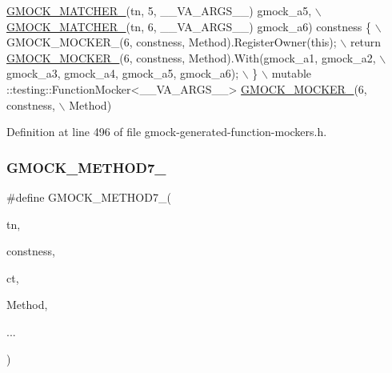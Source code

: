 \begin{DoxyCode}
                     \hyperlink{gmock-generated-function-mockers_8h_aa87d0009fe91f1c89d658776b55a769c}{GMOCK\_MATCHER\_}(tn, 5, \_\_VA\_ARGS\_\_) gmock\_a5, \(\backslash\)
                     \hyperlink{gmock-generated-function-mockers_8h_aa87d0009fe91f1c89d658776b55a769c}{GMOCK\_MATCHER\_}(tn, 6, \_\_VA\_ARGS\_\_) gmock\_a6) constness \{ \(\backslash\)
    GMOCK\_MOCKER\_(6, constness, Method).RegisterOwner(\textcolor{keyword}{this}); \(\backslash\)
    return \hyperlink{gmock-generated-function-mockers_8h_a7d362499e27b1bc3a9806dd3cf58a5b7}{GMOCK\_MOCKER\_}(6, constness, Method).With(gmock\_a1, gmock\_a2, \(\backslash\)
        gmock\_a3, gmock\_a4, gmock\_a5, gmock\_a6); \(\backslash\)
  \} \(\backslash\)
  mutable ::testing::FunctionMocker<\_\_VA\_ARGS\_\_> \hyperlink{gmock-generated-function-mockers_8h_a7d362499e27b1bc3a9806dd3cf58a5b7}{GMOCK\_MOCKER\_}(6, constness, \(\backslash\)
      Method)
\end{DoxyCode}


Definition at line 496 of file gmock-\/generated-\/function-\/mockers.\+h.

\mbox{\label{gmock-generated-function-mockers_8h_ab98a8399ba62b53b375c2807f4d39d2f}} 
\subsubsection{\texorpdfstring{G\+M\+O\+C\+K\+\_\+\+M\+E\+T\+H\+O\+D7\+\_\+}{GMOCK\_METHOD7\_}}
{\footnotesize\ttfamily \#define G\+M\+O\+C\+K\+\_\+\+M\+E\+T\+H\+O\+D7\+\_\+(\begin{DoxyParamCaption}\item[{}]{tn,  }\item[{}]{constness,  }\item[{}]{ct,  }\item[{}]{Method,  }\item[{}]{... }\end{DoxyParamCaption})}


